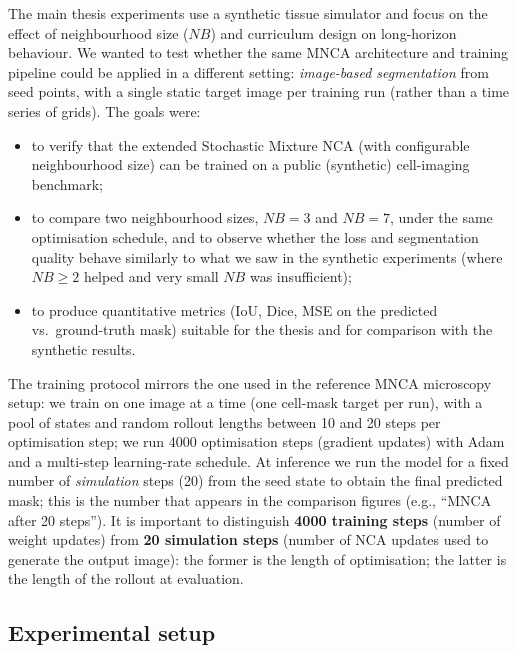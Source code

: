 The main thesis experiments use a synthetic tissue simulator and focus on the effect of neighbourhood size (\(NB\)) and curriculum design on long-horizon behaviour.
We wanted to test whether the same MNCA architecture and training pipeline could be applied in a different setting: \emph{image-based segmentation} from seed points, with a single static target image per training run (rather than a time series of grids).
The goals were:
\begin{itemize}
  \item to verify that the extended Stochastic Mixture NCA (with configurable neighbourhood size) can be trained on a public (synthetic) cell-imaging benchmark;
  \item to compare two neighbourhood sizes, \(NB=3\) and \(NB=7\), under the same optimisation schedule, and to observe whether the loss and segmentation quality behave similarly to what we saw in the synthetic experiments (where \(NB\ge2\) helped and very small \(NB\) was insufficient);
  \item to produce quantitative metrics (IoU, Dice, MSE on the predicted vs.\ ground-truth mask) suitable for the thesis and for comparison with the synthetic results.
\end{itemize}

The training protocol mirrors the one used in the reference MNCA microscopy setup: we train on one image at a time (one cell-mask target per run), with a pool of states and random rollout lengths between 10 and 20 steps per optimisation step; we run 4000 optimisation steps (gradient updates) with Adam~\cite{kingma2014adam} and a multi-step learning-rate schedule.
At inference we run the model for a fixed number of \emph{simulation} steps (20) from the seed state to obtain the final predicted mask; this is the number that appears in the comparison figures (e.g., ``MNCA after 20 steps'').
It is important to distinguish \textbf{4000 training steps} (number of weight updates) from \textbf{20 simulation steps} (number of NCA updates used to generate the output image): the former is the length of optimisation; the latter is the length of the rollout at evaluation.

\subsection{Experimental setup}
\label{sec:impl:bbbc031:setup}

